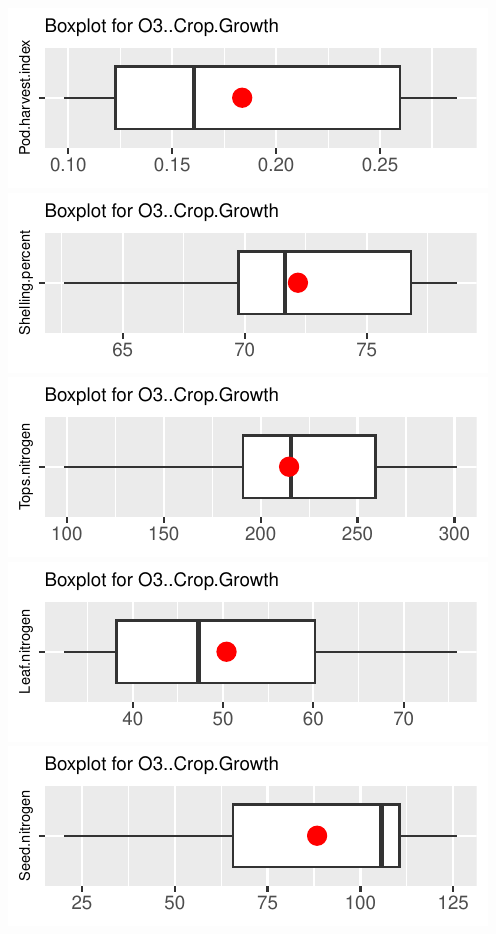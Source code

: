 \documentclass[
]{article}
\begin{document}
\includegraphics{FL_Crop_BMP_QA_single_dataset_files/figure-latex/check-content-of-sheets-43.pdf}
\includegraphics{FL_Crop_BMP_QA_single_dataset_files/figure-latex/check-content-of-sheets-44.pdf}
\includegraphics{FL_Crop_BMP_QA_single_dataset_files/figure-latex/check-content-of-sheets-45.pdf}
\includegraphics{FL_Crop_BMP_QA_single_dataset_files/figure-latex/check-content-of-sheets-46.pdf}
\includegraphics{FL_Crop_BMP_QA_single_dataset_files/figure-latex/check-content-of-sheets-47.pdf}
\end{document}
